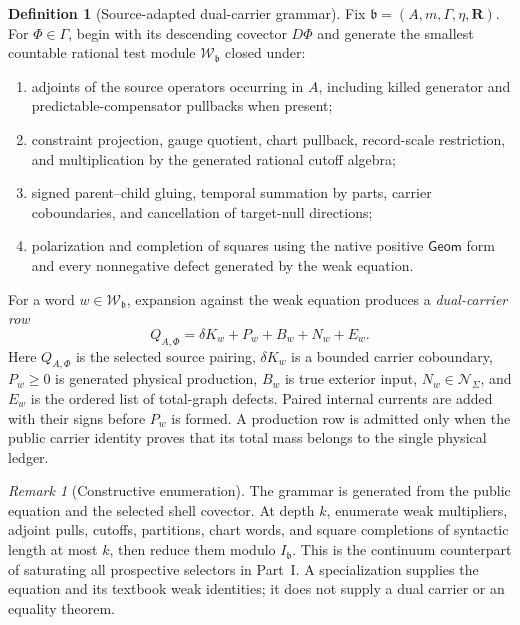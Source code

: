 \documentclass[11pt]{article}
\numberwithin{section}{part}
\theoremstyle{plain}
\theoremstyle{definition}
\newtheorem{definition}[definition]{Definition}
\theoremstyle{remark}
\newtheorem{remark}[remark]{Remark}
\newcommand{\Geom}{\mathsf{Geom}}
\newcommand{\Null}{\mathscr N}
\begin{document}
\begin{definition}[Source-adapted dual-carrier grammar]
\label{def:source-adapted-dual-carrier-grammar}
Fix \(\mathfrak b=(A,m,\Gamma,\eta,\mathbf R)\).  For
\(\Phi\in\Gamma\), begin with its descending covector \(D\Phi\) and generate
the smallest countable rational test module \(\mathscr W_{\mathfrak b}\)
closed under:
\begin{enumerate}[label=\textup{(D\arabic*)}]
\item adjoints of the source operators occurring in \(A\), including killed
generator and predictable-compensator pullbacks when present;
\item constraint projection, gauge quotient, chart pullback, record-scale
restriction, and multiplication by the generated rational cutoff algebra;
\item signed parent--child gluing, temporal summation by parts, carrier
coboundaries, and cancellation of target-null directions;
\item polarization and completion of squares using the native positive
\(\Geom\) form and every nonnegative defect generated by the weak equation.
\end{enumerate}
For a word \(w\in\mathscr W_{\mathfrak b}\), expansion against the weak
equation produces a \emph{dual-carrier row}
\begin{equation}
 \label{eq:source-adapted-dual-carrier-row}
 Q_{A,\Phi}
 =\delta K_w+P_w+B_w+N_w+E_w.
\end{equation}
Here \(Q_{A,\Phi}\) is the selected source pairing, \(\delta K_w\) is a
bounded carrier coboundary, \(P_w\ge0\) is generated physical production,
\(B_w\) is true exterior input, \(N_w\in\Null_\Sigma\), and \(E_w\) is the
ordered list of total-graph defects.  Paired internal currents are added with
their signs before \(P_w\) is formed.  A production row is admitted only when
the public carrier identity proves that its total mass belongs to the single
physical ledger.
\end{definition}

\begin{remark}[Constructive enumeration]
The grammar is generated from the public equation and the selected shell
covector.  At depth \(k\), enumerate weak multipliers, adjoint pulls, cutoffs,
partitions, chart words, and square completions of syntactic length at most
\(k\), then reduce them modulo \(I_{\mathfrak b}\).  This is the continuum
counterpart of saturating all prospective selectors in Part~I.  A
specialization supplies the equation and its textbook weak identities; it
does not supply a dual carrier or an equality theorem.
\end{remark}
\end{document}
